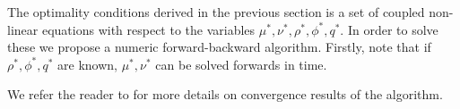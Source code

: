 The optimality conditions derived in the previous section is a set of coupled non-linear equations with respect to the variables $\mu^{*},\nu^*,\rho^*,\phi^*,q^*$. In order to solve these we propose a numeric forward-backward algorithm. Firstly, note that if $\rho^*,\phi^*,q^*$ are known, $\mu^{*},\nu^*$ can be solved forwards in time. 

We refer the reader to \cite{takashi17} for more details on convergence results of the algorithm. 
